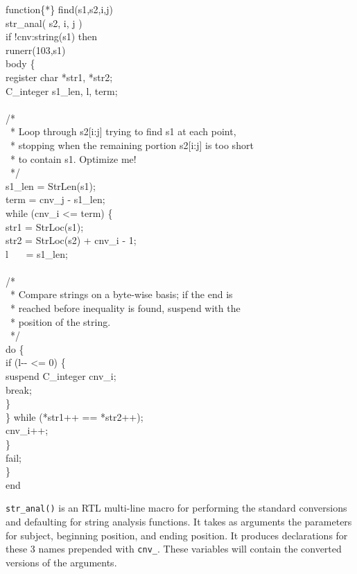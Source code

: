 \begin{iconcode}
function\{*\} find(s1,s2,i,j)\\
\>str\_anal( s2, i, j )\\
\>if !cnv:string(s1) then\\
\>\>runerr(103,s1)\\
\>body \{\\
\>\>register char *str1, *str2;\\
\>\>C\_integer s1\_len, l, term;\\
\\
\>\>/*\\
\>\>\ * Loop through s2[i:j] trying to find s1 at each point,\\
\>\>\ * stopping when the remaining portion s2[i:j] is too short\\
\>\>\ * to contain s1. Optimize me!\\
\>\>\ */\\
\>\>s1\_len = StrLen(s1);\\
\>\>term = cnv\_j - s1\_len;\\
\>\>while (cnv\_i <= term) \{\\
\>\>\>str1 = StrLoc(s1);\\
\>\>\>str2 = StrLoc(s2) + cnv\_i - 1;\\
\>\>\>l \ \ \ = s1\_len;\\
\\
\>\>\>/*\\
\>\>\>\ * Compare strings on a byte-wise basis; if the end is\\
\>\>\>\ * reached before inequality is found, suspend with the\\
\>\>\>\ * position of the string.\\
\>\>\>\ */\\
\>\>\>do \{\\
\>\>\>\>if (l-{}- <= 0) \{\\
\>\>\>\>\>suspend C\_integer cnv\_i;\\
\>\>\>\>\>break;\\
\>\>\>\>\>\}\\
\>\>\>\>\} while (*str1++ == *str2++);\\
\>\>\>cnv\_i++;\\
\>\>\>\}\\
\>\>fail;\\
\>\>\}\\
end
\end{iconcode}

\texttt{str\_anal()} is an RTL multi-line macro for performing the
standard conversions and defaulting for string analysis functions. It
takes as arguments the parameters for subject, beginning position, and
ending position. It produces declarations for these 3 names prepended
with \texttt{cnv\_}. These variables will contain the converted
versions of the arguments.

